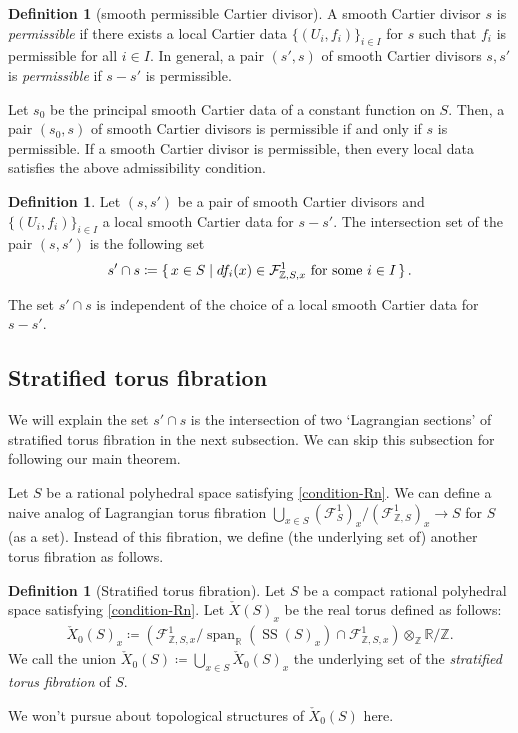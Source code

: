 \documentclass[a4paper,dvipdfmx,reqno,12pt]{amsart}
\theoremstyle{definition}
\newtheorem{definition}[theorem]{Definition}
\newcommand{\deq}{\coloneqq}
\newcommand{\Z}{\mathbb{Z}}%
\newcommand{\opn}[1]{\operatorname{#1}}
\numberwithin{equation}{section}
\begin{document}
\begin{definition}[{smooth permissible Cartier divisor}]
\label{definition-permissible-smooth-cartier-divisor}
A smooth Cartier divisor $s$ is \emph{permissible} 
if there exists a local Cartier data $\{(U_i,f_i)\}_{i\in I}$ 
for $s$
such that $f_i$ is permissible for all $i\in I$. 
In general, a pair $(s',s)$ of smooth 
Cartier divisors $s,s'$ is 
\emph{permissible} if $s-s'$ is 
permissible. 
\end{definition}

Let $s_0$ be the principal smooth Cartier data of 
a constant function on $S$. Then, a pair 
$(s_0,s)$ of smooth Cartier divisors is permissible
if and only if $s$ is permissible.
If a smooth Cartier divisor is permissible, 
then every local data satisfies the above 
admissibility condition.

\begin{definition}
Let $(s,s')$ be a pair of smooth Cartier divisors and 
$\{(U_i,f_i)\}_{i\in I}$ a local smooth Cartier data
for $s-s'$. The intersection set of the pair 
$(s,s')$ is the following set
\begin{align}
s'\cap s\deq \set{x\in S \mid  df_i(x)\in 
\mathcal{F}^{1}_{\mathbb{Z},S,x} 
\text{ for some } i\in I}.
\end{align}
\end{definition}

The set $s'\cap s$ is independent of the choice of 
a local smooth Cartier data for $s-s'$. 

\subsection{Stratified torus fibration}
\label{section-stratified-torus-fibration}
We will explain the set $s'\cap s$ is the 
intersection of two `Lagrangian sections' of
stratified torus fibration in the next subsection.
We can skip this subsection for following 
our main theorem.  

Let $S$ be a rational polyhedral space satisfying
\cref{condition-Rn}.
We can define a naive analog of Lagrangian torus 
fibration 
$\bigcup_{x\in S}(\mathcal{F}^{1}_{S})_x/
(\mathcal{F}^{1}_{\mathbb{Z},S})_x \to S$
for $S$ (as a set). Instead of this fibration, 
we define (the underlying set of) 
another torus fibration as follows. 
\begin{definition}[{Stratified torus fibration}]
Let $S$ be a compact rational polyhedral space 
satisfying \cref{condition-Rn}.
Let $\check{X}(S)_x$ be 
the real torus defined as follows:
\begin{align}
\check{X}_0(S)_x\deq  
(\mathcal{F}_{\mathbb{Z},S,x}^{1}/\opn{span}_{{\mathbb{R}}}
(\opn{SS}(S)_x)\cap \mathcal{F}_{\mathbb{Z},S,x}^{1})\otimes_{\Z} {\mathbb{R}}/\Z.
\end{align}
We call the union $\check{X}_0(S)\deq \bigcup_{x\in S}
\check{X}_0(S)_x$
the underlying set of the \emph{stratified torus 
fibration} of $S$.
\end{definition}
We won't pursue about
topological structures of $\check{X}_0(S)$ 
here.
\end{document}
